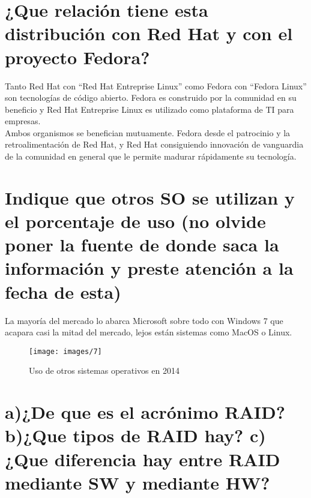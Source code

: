 \section{¿Que relación tiene esta distribución con Red Hat y con el proyecto Fedora? \cite{07p61}}
Tanto Red Hat con “Red Hat Entreprise Linux” como Fedora con “Fedora Linux” son tecnologías de código abierto. Fedora es construido por la comunidad en su beneficio y Red Hat Entreprise Linux es utilizado como plataforma de TI para empresas.\\
Ambos organismos se benefician mutuamente. Fedora desde el patrocinio y la retroalimentación de Red Hat, y Red Hat consiguiendo innovación de vanguardia de la comunidad en general que le permite madurar rápidamente su tecnología.\\
\clearpage

\section{Indique que otros SO se utilizan y el porcentaje de uso (no olvide poner la fuente de donde saca la información y preste atención a la fecha de esta) \cite{08p71}}

La mayoría del mercado lo abarca Microsoft sobre todo con Windows 7 que acapara casi la mitad del mercado, lejos están sistemas como MacOS o Linux.\\
\begin{figure}[H]
	\centering
	\texttt{[image: images/7]}
	\caption{Uso de otros sistemas operativos en 2014}
	\label{fig:c0701}
\end{figure}

\section{a)¿De que es el acrónimo RAID? b)¿Que tipos de RAID hay? c)¿Que diferencia hay entre RAID mediante SW y mediante HW? \cite{09p81}}
		 
